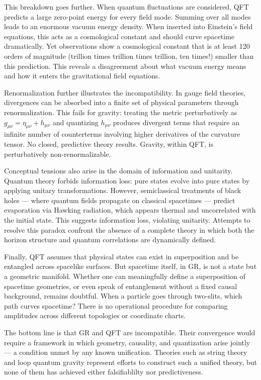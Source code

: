 This breakdown goes further. When quantum fluctuations are considered, QFT predicts a large zero-point energy for every field mode. Summing over all modes leads to an enormous vacuum energy density. When inserted into Einstein’s field equations, this acts as a cosmological constant and should curve spacetime dramatically. Yet observations show a cosmological constant that is at least 120 orders of magnitude (trillion times trillion times trillion, ten times!) smaller than this prediction. This reveals a disagreement about what vacuum energy means and how it enters the gravitational field equations.

Renormalization further illustrates the incompatibility. In gauge field theories, divergences can be absorbed into a finite set of physical parameters through renormalization. This fails for gravity: treating the metric perturbatively as $g_{\mu\nu} = \eta_{\mu\nu} + h_{\mu\nu}$ and quantizing $h_{\mu\nu}$ produces divergent terms that require an infinite number of counterterms involving higher derivatives of the curvature tensor. No closed, predictive theory results. Gravity, within QFT, is perturbatively non-renormalizable.

Conceptual tensions also arise in the domain of information and unitarity. Quantum theory forbids information loss: pure states evolve into pure states by applying unitary transformations. However, semiclassical treatments of black holes — where quantum fields propagate on classical spacetimes — predict evaporation via Hawking radiation, which appears thermal and uncorrelated with the initial state. This suggests information loss, violating unitarity. Attempts to resolve this paradox confront the absence of a complete theory in which both the horizon structure and quantum correlations are dynamically defined.

Finally, QFT assumes that physical states can exist in superposition and be entangled across spacelike surfaces. But spacetime itself, in GR, is not a state but a geometric manifold. Whether one can meaningfully define a superposition of spacetime geometries, or even speak of entanglement without a fixed causal background, remains doubtful. When a particle goes through two-slits, which path curves spacetime? There is no operational procedure for comparing amplitudes across different topologies or coordinate charts.

The bottom line is that GR and QFT are incompatible. Their convergence would require a framework in which geometry, causality, and quantization arise jointly — a condition unmet by any known unification. Theories such as string theory and loop quantum gravity represent efforts to construct such a unified theory, but none of them has achieved either falsifiablilty nor predictiveness.

